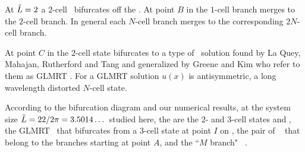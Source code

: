 At $\tilde{L}=2$ a $2$-cell \eqv\ bifurcates off the  \eqv.
At point $B$ in  the $1$-cell branch merges 
to the $2$-cell branch.  In general each $N$-cell branch merges 
to the corresponding $2N$-cell branch.

At point $C$ in 
the $2$-cell state bifurcates to a type of \eqv\ solution
found by La Quey, Mahajan, Rutherford and Tang 
and generalized by Greene and Kim who refer to them as GLMRT \eqva.
For a GLMRT solution $u(x)$ is antisymmetric,
a long wavelength distorted $N$-cell state.


According to the bifurcation diagram
and our numerical results,
at the system size $\tilde{L}=22/2\pi = 3.5014\dots$ studied here,
the {\eqva} are the $2$- and $3$-cell states  and ,
the GLMRT \eqv\ that bifurcates from a $3$-cell state at point $I$
on ,
the pair of \reqva\  
that belong to the branches starting at point
$A$,
and the ``$M$ branch"  \reqva\ .

